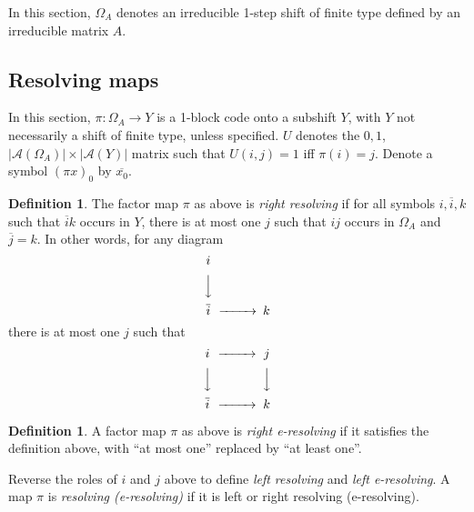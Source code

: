 \documentclass{kepart2010}
\theoremstyle{plain}
\theoremstyle{definition}
\newtheorem{defn}[thm]{Definition}
\theoremstyle{remark}
\theoremstyle{definition}
\numberwithin{equation}{section}
\begin{document}
In this section,
 $\Omega_A$ denotes an irreducible 1-step shift of
finite type defined by an irreducible matrix $A$.

\subsection{Resolving maps}\label{sec_resolving}

 In this section,
$\pi :\Omega_A \to Y$ is a 1-block code onto a subshift $Y$, with
$Y$ not necessarily a shift of finite type, unless specified. $U$
denotes the $0,1$, $|\mathcal A(\Omega_A )| \times |\mathcal A(Y )|$
matrix such that $U(i,j)=1$ iff $\pi (i)=j$. Denote a symbol $(\pi
x)_0$ by $\overline{x_0}$.
\begin{defn}
The factor map $\pi$ as above is {\em right resolving} if for all
symbols $i,\overline i, k$ such that $\overline i k $ occurs in $Y$,
there is at most one $j$ such that $ij$ occurs in $\Omega_A$ and
$\overline j=k$. In other words,  for any diagram
\begin{equation}
\begin{CD}
i &  &  \\
@VVV & & \\
\overline{i}& @>>> & k
\end{CD}
\end{equation}
there is at most one $j$ such that
\begin{equation}
\begin{CD}
i & @>>> & j \\
@VVV & & @VVV\\
\overline{i}& @>>> & k
\end{CD}
\end{equation}
\end{defn}
\begin{defn}
A factor map $\pi$ as above is {\em right e-resolving} if it
satisfies the definition above, with ``at most one'' replaced by
``at least one''.
\end{defn}
Reverse the roles of $i$ and $j$ above to define {\em left
resolving} and {\em left e-resolving}.
A map $\pi$ is {\em resolving
(e-resolving)} if it is left or right resolving (e-resolving).
\end{document}

